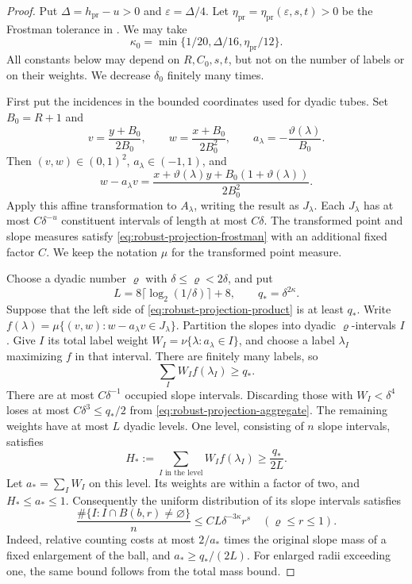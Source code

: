 \begin{proof}
Put $\Delta=h_{\mathrm{pr}}-u>0$ and $\varepsilon=\Delta/4$. Let
$\eta_{\mathrm{pr}}=\eta_{\mathrm{pr}}(\varepsilon,s,t)>0$ be the Frostman tolerance in
\citet[Theorem~4.1]{RW2025}. We may take
\begin{equation}\label{eq:robust-projection-kappa}
 \kappa_0=\min\{1/20,\Delta/16,\eta_{\mathrm{pr}}/12\}.
\end{equation}
All constants below may depend on $R,C_0,s,t$, but not on the
number of labels or on their weights. We decrease $\delta_0$
finitely many times.

First put the incidences in the bounded coordinates used for
dyadic tubes. Set $B_0=R+1$ and
\[
 v=\frac{y+B_0}{2B_0},\qquad
 w=\frac{x+B_0}{2B_0^2},\qquad
 a_\lambda=-\frac{\vartheta(\lambda)}{B_0}.
\]
Then $(v,w)\in(0,1)^2$, $a_\lambda\in(-1,1)$, and
\[
 w-a_\lambda v
 =\frac{x+\vartheta(\lambda)y+B_0(1+\vartheta(\lambda))}
        {2B_0^2}.
\]
Apply this affine transformation to $A_\lambda$, writing the
result as $J_\lambda$. Each $J_\lambda$ has at most
$C\delta^{-u}$ constituent intervals of length at most $C\delta$.
The transformed point and slope measures satisfy
\eqref{eq:robust-projection-frostman} with an additional fixed
factor $C$. We keep the notation $\mu$ for the transformed point
measure.

Choose a dyadic number $\varrho$ with
$\delta\le\varrho<2\delta$, and put
\[
 L=8\lceil\log_2(1/\delta)\rceil+8,
 \qquad q_*=\delta^{2\kappa}.
\]
Suppose that the left side of \eqref{eq:robust-projection-product}
is at least $q_*$. Write
$f(\lambda)=\mu\{(v,w):w-a_\lambda v\in J_\lambda\}$.
Partition the slopes into dyadic $\varrho$-intervals $I$. Give
$I$ its total label weight
$W_I=\nu\{\lambda:a_\lambda\in I\}$, and choose a label
$\lambda_I$ maximizing $f$ in that interval. There are finitely
many labels, so
\begin{equation}\label{eq:robust-projection-aggregate}
 \sum_I W_If(\lambda_I)\ge q_*.
\end{equation}
There are at most $C\delta^{-1}$ occupied slope intervals.
Discarding those with $W_I<\delta^4$ loses at most
$C\delta^3\le q_*/2$ from \eqref{eq:robust-projection-aggregate}.
The remaining weights have at most $L$ dyadic levels. One level,
consisting of $n$ slope intervals, satisfies
\[
 H_*:=\sum_{I\text{ in the level}}W_If(\lambda_I)
 \ge\frac{q_*}{2L}.
\]
Let $a_* =\sum_I W_I$ on this level. Its weights are within a
factor of two, and $H_*\le a_*\le1$. Consequently the uniform
distribution of its slope intervals satisfies
\begin{equation}\label{eq:robust-projection-slopes}
 \frac{\#\{I:I\cap B(b,r)\ne\varnothing\}}n
 \le CL\delta^{-3\kappa}r^s
 \quad(\varrho\le r\le1).
\end{equation}
Indeed, relative counting costs at most $2/a_*$ times the
original slope mass of a fixed enlargement of the ball, and
$a_*\ge q_*/(2L)$. For enlarged radii exceeding one, the same
bound follows from the total mass bound.


\end{proof}
